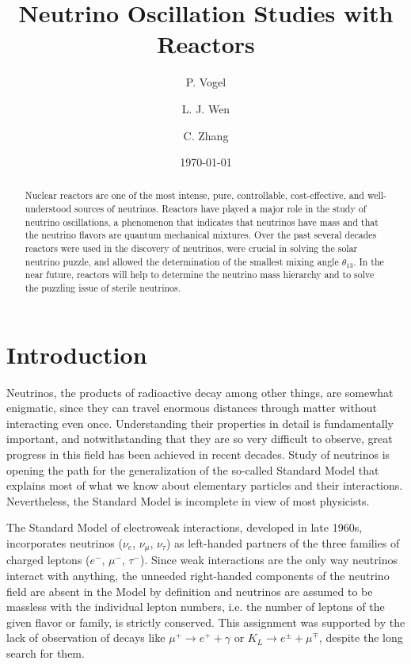 \documentclass[aps,twocolumn,preprintnumbers,amsmath,superscriptaddress,amssymb,floats,nofootinbib]{revtex4-1}
\begin{document}
\title{Neutrino Oscillation Studies with Reactors}
\date{\today}
\author{P. Vogel}
\author{L. J. Wen}
\author{C. Zhang}


\begin{abstract}
Nuclear reactors are one of the most intense, pure, controllable, cost-effective, and well-understood sources of neutrinos. Reactors have played a major 
role in the study of neutrino oscillations, a phenomenon that indicates that neutrinos have mass and that the neutrino flavors are quantum mechanical mixtures. Over the past several decades reactors were used in the discovery of neutrinos, were crucial in solving the solar neutrino puzzle, and allowed the determination of the smallest mixing angle $\theta_{13}$. In the near future, reactors will help to determine the neutrino mass hierarchy and to solve the puzzling issue of sterile neutrinos.
\end{abstract}

\maketitle
\thispagestyle{plain}

\section{Introduction} 
\label{sec:intro}
Neutrinos, the products of  radioactive decay among other things, are somewhat enigmatic, since they can travel enormous distances through matter without interacting even once. 
Understanding their properties in detail is fundamentally important, and notwithstanding that they are so very difficult to observe, great progress in this field has been achieved in recent decades.   
Study of neutrinos is opening the path for the generalization of the so-called Standard Model that explains most of what we know 
about elementary particles and their interactions. 
Nevertheless, the Standard Model is incomplete in view of most physicists.

The Standard Model of electroweak interactions,
developed in late 1960s, incorporates neutrinos ($\nu_e$, $\nu_\mu$, $\nu_\tau$) as left-handed partners of the three families of charged leptons ($e^-$, $\mu^-$, $\tau^-$). 
Since weak interactions are the only way neutrinos interact with anything, the unneeded right-handed components of the neutrino field are absent 
in the Model by definition and neutrinos are assumed to be massless with the individual lepton numbers, i.e. the number of leptons of the
given flavor or family, is strictly conserved.
This assignment was supported by the lack of observation of decays like 
$\mu^+ \rightarrow e^+ + \gamma$ or $K_L \rightarrow e^{\pm} + \mu^{\mp}$,
despite the long search for them.
\end{document}
